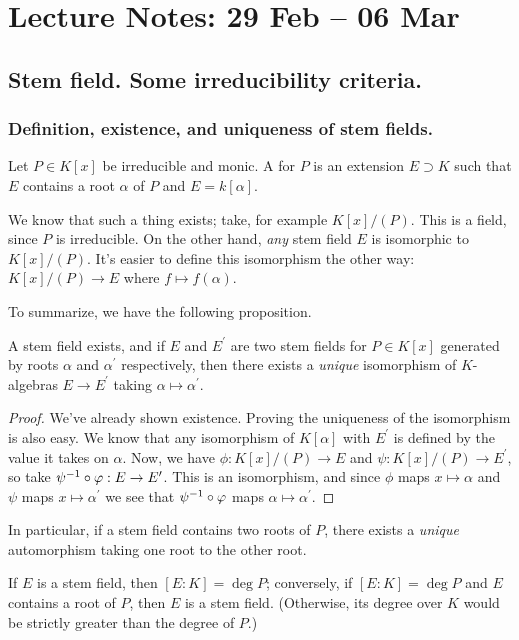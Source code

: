 \section[Stem field, splitting field, algebraic closure]{Lecture Notes: 29 Feb -- 06 Mar}

\subsection{Stem field. Some irreducibility criteria.}
\subsubsection{Definition, existence, and uniqueness of stem fields.}
\begin{defn}
Let $P \in K[x]$ be irreducible and monic. A  for $P$ is an extension $E \supset K$ such that $E$ contains a root $\alpha$ of $P$ and $E = k[\alpha]$.
\end{defn}

We know that such a thing exists; take, for example $K[x]/(P)$. This is a field, since $P$ is irreducible. On the other hand, \emph{any} stem field $E$ is isomorphic to $K[x]/(P)$. It's easier to define this isomorphism the other way: $K[x]/(P) \to E$ where $f \mapsto f(\alpha)$.

To summarize, we have the following proposition.

\begin{prop}
A stem field exists, and if $E$ and $E^\prime$ are two stem fields for $P \in K[x]$ generated by roots $\alpha$ and $\alpha^\prime$ respectively, then there exists a \emph{unique} isomorphism of $K$-algebras $E \to E^\prime$ taking $\alpha \mapsto \alpha^\prime$.
\end{prop}
\begin{proof}
We've already shown existence. Proving the uniqueness of the isomorphism is also easy. We know that any isomorphism of $K[\alpha]$ with $E^\prime$ is defined by the value it takes on $\alpha$. Now, we have $\phi: K[x]/(P) \to E$ and $\psi: K[x]/(P) \to E^\prime$, so take $\psi^{-1} \circ \varphi: E \to E^\prime$. This is an isomorphism, and since $\phi$ maps $x \mapsto \alpha$ and $\psi$ maps $x \mapsto \alpha^\prime$ we see that $\psi^{-1} \circ \varphi$ maps $\alpha \mapsto \alpha^\prime$.
\end{proof}

\begin{rmk}
In particular, if a stem field contains two roots of $P$, there exists a \emph{unique} automorphism taking one root to the other root.
\end{rmk}
\begin{rmk}
If $E$ is a stem field, then $[E:K] = \deg P$; conversely, if $[E:K] = \deg P$ and $E$ contains a root of $P$, then $E$ is a stem field. (Otherwise, its degree over $K$ would be strictly greater than the degree of $P$.)
\end{rmk}

